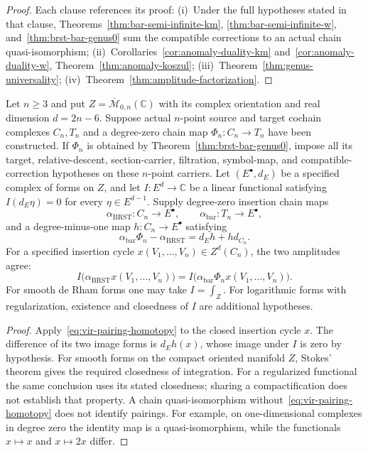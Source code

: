 \begin{proof}
Each clause references its proof:
(i)~Under the full hypotheses stated in that clause, Theorems~\ref{thm:bar-semi-infinite-km}, \ref{thm:bar-semi-infinite-w}, and~\ref{thm:brst-bar-genus0} sum the compatible corrections to an actual chain quasi-isomorphism;
(ii)~Corollaries~\ref{cor:anomaly-duality-km}
and~\ref{cor:anomaly-duality-w},
Theorem~\ref{thm:anomaly-koszul};
(iii)~Theorem~\ref{thm:genus-universality};
(iv)~Theorem~\ref{thm:amplitude-factorization}.
\end{proof}

\begin{corollary}\label{cor:string-amplitude-genus0}
Let $n\geq3$ and put $Z=\overline{\mathcal M}_{0,n}(\mathbb C)$ with its complex orientation and real dimension $d=2n-6$.
Suppose actual $n$-point source and target cochain complexes $C_n,T_n$ and a degree-zero chain map $\Phi_n:C_n\to T_n$ have been constructed.
If $\Phi_n$ is obtained by Theorem~\ref{thm:brst-bar-genus0}, impose all its target, relative-descent, section-carrier, filtration, symbol-map, and compatible-correction hypotheses on these $n$-point carriers.
Let $(E^\bullet,d_E)$ be a specified complex of forms on $Z$, and let
$I:E^d\to\mathbb C$ be a linear functional satisfying $I(d_E\eta)=0$ for every $\eta\in E^{d-1}$.
Supply degree-zero insertion chain maps
\[
 \alpha_{\mathrm{BRST}}:C_n\to E^\bullet,
 \qquad \alpha_{\mathrm{bar}}:T_n\to E^\bullet,
\]
and a degree-minus-one map $h:C_n\to E^\bullet$ satisfying
\begin{equation}\label{eq:vir-pairing-homotopy}
 \alpha_{\mathrm{bar}}\Phi_n-\alpha_{\mathrm{BRST}}
 =d_Eh+h d_{C_n}.
\end{equation}
For a specified insertion cycle $x(V_1,\ldots,V_n)\in Z^d(C_n)$, the two amplitudes agree:
\[
 I\bigl(\alpha_{\mathrm{BRST}}x(V_1,\ldots,V_n)\bigr)
 =I\bigl(\alpha_{\mathrm{bar}}\Phi_nx(V_1,\ldots,V_n)\bigr).
\]
For smooth de Rham forms one may take $I=\int_Z$.
For logarithmic forms with regularization, existence and closedness of $I$ are additional hypotheses.
\end{corollary}

\begin{proof}
Apply~\eqref{eq:vir-pairing-homotopy} to the closed insertion cycle $x$.
The difference of its two image forms is $d_Eh(x)$, whose image under $I$ is zero by hypothesis.
For smooth forms on the compact oriented manifold $Z$, Stokes' theorem gives the required closedness of integration.
For a regularized functional the same conclusion uses its stated closedness; sharing a compactification does not establish that property.
A chain quasi-isomorphism without~\eqref{eq:vir-pairing-homotopy} does not identify pairings.
For example, on one-dimensional complexes in degree zero the identity map is a quasi-isomorphism, while the functionals $x\mapsto x$ and $x\mapsto2x$ differ.
\end{proof}

